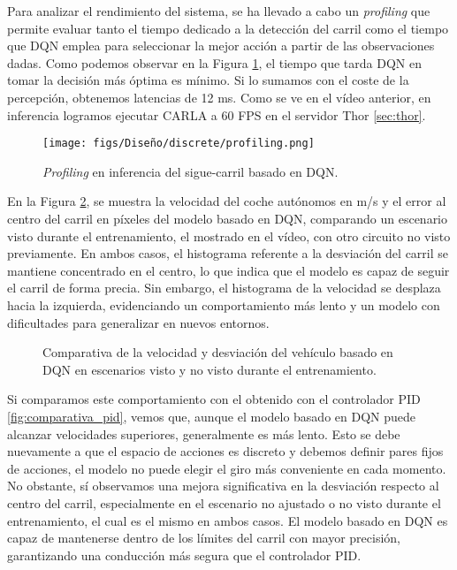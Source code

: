 Para analizar el rendimiento del sistema, se ha llevado a cabo un \textit{profiling} que permite evaluar tanto el tiempo dedicado a la detección del carril como el tiempo que \ac{DQN} emplea para seleccionar la mejor acción a partir de las observaciones dadas. Como podemos observar en la Figura \ref{fig:profiling_dqn}, el tiempo que tarda \ac{DQN} en tomar la decisión más óptima es mínimo. Si lo sumamos con el coste de la percepción, obtenemos latencias de 12 ms. Como se ve en el vídeo anterior\footnotemark, en inferencia logramos ejecutar CARLA a 60 \ac{FPS} en el servidor Thor \ref{sec:thor}.

\begin{figure}[ht]
\centering
\texttt{[image: figs/Diseño/discrete/profiling.png]}
\caption{\textit{Profiling} en inferencia del sigue-carril basado en \ac{DQN}.}
\label{fig:profiling_dqn}
\end{figure}


En la Figura \ref{fig:comparativa_dqn}, se muestra la velocidad del coche autónomos en m/s y el error al centro del carril en píxeles del modelo basado en \ac{DQN}, comparando un escenario visto durante el entrenamiento, el mostrado en el vídeo, con otro circuito no visto previamente. En ambos casos, el histograma referente a la desviación del carril se mantiene concentrado en el centro, lo que indica que el modelo es capaz de seguir el carril de forma precia. Sin embargo, el histograma de la velocidad se desplaza hacia la izquierda, evidenciando un comportamiento más lento y un modelo con dificultades para generalizar en nuevos entornos.
\begin{figure}[ht]
\centering
{}
\hfill
{}
\caption{Comparativa de la velocidad y desviación del vehículo basado en \ac{DQN} en escenarios visto y no visto durante el entrenamiento.}
\label{fig:comparativa_dqn}
\end{figure}

Si comparamos este comportamiento con el obtenido con el controlador \ac{PID} \ref{fig:comparativa_pid}, vemos que, aunque el modelo basado en \ac{DQN} puede alcanzar velocidades superiores, generalmente es más lento. Esto se debe nuevamente a que el espacio de acciones es discreto y debemos definir pares fijos de acciones, el modelo no puede elegir el giro más conveniente en cada momento. No obstante, sí observamos una mejora significativa en la desviación respecto al centro del carril, especialmente en el escenario no ajustado o no visto durante el entrenamiento, el cual es el mismo en ambos casos. El modelo basado en \ac{DQN} es capaz de mantenerse dentro de los límites del carril con mayor precisión, garantizando una conducción más segura que el controlador \ac{PID}.

